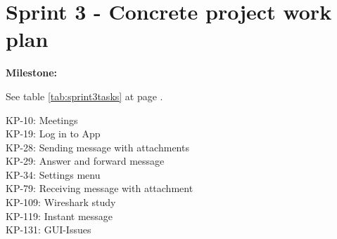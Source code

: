\section{Sprint 3 - Concrete project work plan}

\textbf{Milestone:} 

See table \ref{tab:sprint3tasks} at page \pageref{tab:sprint3tasks}.
\begin{table}
KP-10: Meetings\\
KP-19: Log in to App\\
KP-28: Sending message with attachments\\
KP-29: Answer and forward message\\
KP-34: Settings menu\\
KP-79: Receiving message with attachment\\
KP-109: Wireshark study\\
KP-119: Instant message\\
KP-131: GUI-Issues\\


\end{table}
